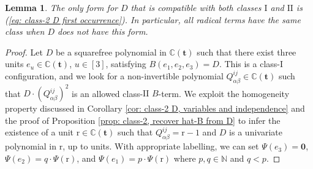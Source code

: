 \documentclass[10pt]{article}
\newtheorem{lem}{Lemma}%
\theoremstyle{remark}%
\theoremstyle{definition}%
\begin{document}
\begin{lem}
\label{lem: concurrence of two classes} The only form for $D$ that is compatible with both classes $\mathrm{I}$ and $\mathrm{II}$ is (\ref{eq: class-2 D first occurrence}). In particular, all radical terms have the same class when $D$ does not have this form. 
\end{lem}
\begin{proof}
Let $D$ be a squarefree polynomial in $\mathbb{C}(\mathbf{t})$ such that there exist three units $e_{u}\in\mathbb{C}(\mathbf{t})$, $u\in[3]$, satisfying $B(e_{1},e_{2},e_{3})=D$. This is a class-$\mathrm{I}$ configuration, and we look for a non-invertible polynomial $Q_{\alpha\beta}^{ij}\in\mathbb{C}(\mathbf{t})$ such that $D\cdot(Q_{\alpha\beta}^{ij})^{2}$ is an allowed class-$\mathrm{II}$ $B$-term. 
We exploit the homogeneity property discussed in Corollary \ref{cor: class-2 D, variables and independence} and the proof of Proposition \ref{prop: class-2, recover hat-B from D} to infer the existence of a unit $\mathrm{r}\in\mathbb{C}(\mathbf{t})$ such that $Q_{\alpha\beta}^{ij}=\mathrm{r}-1$ and $D$ is a univariate polynomial in $\mathrm{r}$, up to units. With appropriate labelling, we can set $\Psi(e_{3})=\mathbf{0}$, $\Psi(e_{2})=q\cdot\Psi(\mathrm{r})$, and $\Psi(e_{1})=p\cdot\Psi(\mathrm{r})$ where $p,q\in\mathbb{N}$ and $q< p$. 


\end{proof}
\end{document}
